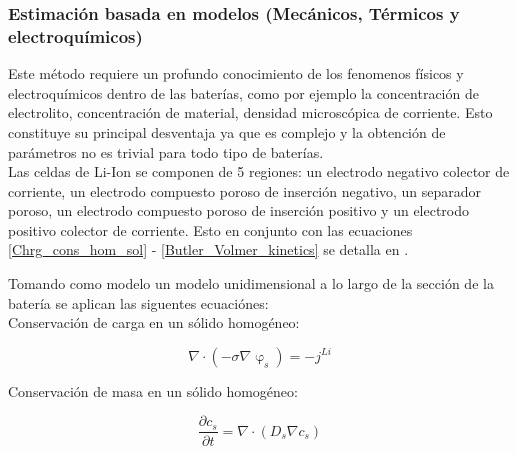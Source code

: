 \documentclass[10pt,a4paper]{article}
\begin{document}
\clearpage

\subsubsection{Estimación basada en modelos (Mecánicos, Térmicos y electroquímicos)}
Este método requiere un profundo conocimiento de los fenomenos físicos y electroquímicos dentro de las baterías, como por ejemplo la concentración de electrolito, concentración de material, densidad microscópica de corriente. Esto constituye su principal desventaja ya que es complejo y la obtención de parámetros no es trivial para todo tipo de baterías.\\

Las celdas de Li-Ion se componen de 5 regiones: un electrodo negativo colector de corriente, un electrodo compuesto poroso de inserción negativo, un separador poroso, un electrodo compuesto poroso de inserción positivo y un electrodo positivo colector de corriente. Esto en conjunto con las ecuaciones \ref{Chrg_cons_hom_sol} - \ref{Butler_Volmer_kinetics} se detalla en \cite{Li2016}.


Tomando como modelo un modelo unidimensional a lo largo de la sección de la batería se aplican las siguentes ecuaciónes:\\


Conservación de carga en un sólido homogéneo:\\
\begin{figure}[h!]
	\begin{center}
		\begin{equation}
		\nabla \cdot (-\sigma\nabla\upvarphi_s)=-j^{Li} 
		\label{Chrg_cons_hom_sol}
		\end{equation}	
	\end{center}
\end{figure}

Conservación de masa en un sólido homogéneo:\\

\begin{figure}[h!]
	\begin{center}
		\begin{equation}
		\frac{\partial c_s}{\partial t}=\nabla \cdot (D_s\nabla c_s) 
		\label{Mass_cons_hom_sol}
		\end{equation}	
	\end{center}
\end{figure}
\end{document}
